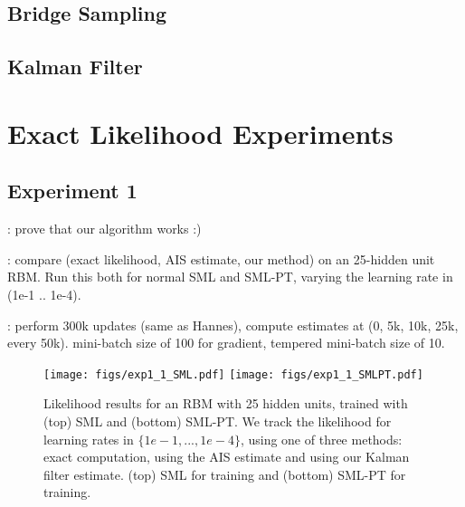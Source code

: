 \documentclass[runningheads,a4paper]{llncs}
\begin{document}
\subsection{Bridge Sampling}
\subsection{Kalman Filter}

\section{Exact Likelihood Experiments}

\newpage
\subsection{Experiment 1}

: prove that our algorithm works :)

: compare (exact likelihood, AIS estimate, our method) on an
25-hidden unit RBM. Run this both for normal SML and SML-PT, varying the
learning rate in (1e-1 .. 1e-4).

: perform 300k updates (same as Hannes), compute estimates at (0, 5k,
10k, 25k, every 50k). mini-batch size of 100 for gradient, tempered mini-batch
size of 10.

\begin{figure}[!htb]
    \centering
    \subfigure
    {
        \texttt{[image: figs/exp1\_1\_SML.pdf]}
    }
    \subfigure
    {
        \texttt{[image: figs/exp1\_1\_SMLPT.pdf]}
    }
    \caption{Likelihood results for an RBM with 25 hidden units, trained with
(top) SML and (bottom) SML-PT. We track the likelihood for learning rates in
$\{1e-1, ..., 1e-4\}$, using one of three methods: exact computation, using the
AIS estimate and using our Kalman filter estimate. (top) SML for training and
(bottom) SML-PT for training.} 
\end{figure}
\end{document}
